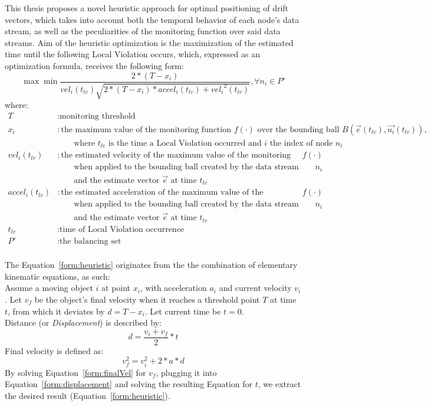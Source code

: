 This thesis proposes a novel heuristic approach for optimal positioning of drift vectors, which takes into account both the temporal behavior of each node's data stream, as well as the peculiarities of the monitoring function over said data streams. Aim of the heuristic optimization is the maximization of the estimated time until the following Local Violation occurs, which, expressed as an optimization formula, receives the following form:
\begin{equation}
\max\min\frac{2*(T-x_i)}{vel_i(t_{lv})\sqrt{2*(T-x_i)*accel_i(t_{lv})+{vel_i}^2(t_{lv})}}, \forall n_i \in P'
\label{form:heuristic}
\end{equation}
where:
\begin{align*}
T&:\text{monitoring threshold}\\
x_i&:\text{the maximum value of the monitoring function $f(\cdot)$ over the bounding ball $B(\vec{e}(t_{lv}), \vec{u_i}(t_{lv}))$,}\\&\qquad\text{where $t_{lv}$ is the time a Local Violation occurred and $i$ the index of node $n_i$}\\
vel_i(t_{lv})&:\text{the estimated velocity of the maximum value of the monitoring function $f(\cdot)$}\\&\qquad\text{when applied to the bounding ball created by the data stream update of node $n_i$}\\&\qquad\text{and the estimate vector $\vec{e}$ at time $t_{lv}$}\\
accel_i(t_{lv})&:\text{the estimated acceleration of the maximum value of the monitoring function $f(\cdot)$}\\&\qquad\text{when applied to the bounding ball created by the data stream update of node $n_i$}\\&\qquad\text{and the estimate vector $\vec{e}$ at time $t_{lv}$}\\
t_{lv}&:\text{time of Local Violation occurrence}\\
P'&:\text{the balancing set}\\
\end{align*}

The Equation~\ref{form:heuristic} originates from the the combination of elementary kinematic equations, as such:\\
Assume a moving object $i$ at point $x_i$, with acceleration $a_i$ and current velocity $v_i$. Let $v_f$ be the object's final velocity when it reaches a threshold point $T$ at time $t$, from which it deviates by $d=T-x_i$. Let current time be $t=0$.\\
Distance (or \emph{Displacement}) is described by:
\begin{equation}
d=\frac{v_i+v_f}{2}*t
\label{form:displacement}
\end{equation}
Final velocity is defined as:
\begin{equation}
v_f^2=v_i^2+2*a*d
\label{form:finalVel}
\end{equation}
By solving Equation~\ref{form:finalVel} for $v_f$, plugging it into Equation~\ref{form:displacement} and solving the resulting Equation for $t$, we extract the desired result (Equation~\ref{form:heuristic}).

